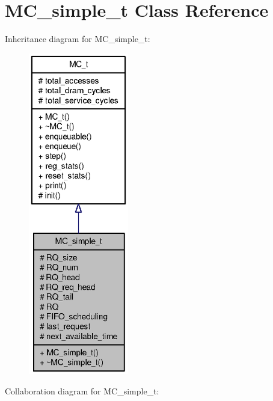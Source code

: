 \section{MC\_\-simple\_\-t Class Reference}
\label{classMC__simple__t}
Inheritance diagram for MC\_\-simple\_\-t:\nopagebreak
\begin{figure}[H]
\begin{center}
\leavevmode
\includegraphics[height=400pt]{classMC__simple__t__inherit__graph}
\end{center}
\end{figure}
Collaboration diagram for MC\_\-simple\_\-t:\nopagebreak
